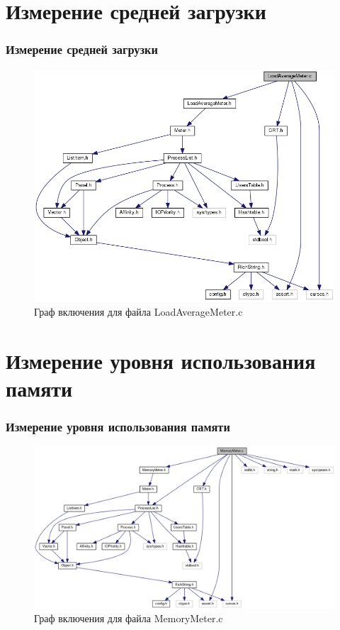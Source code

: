 \documentclass{beamer}
\begin{document}
\section{Измерение средней загрузки}

\begin{frame}
\frametitle{Измерение средней загрузки}

\begin{figure}
\includegraphics[scale=0.3]{res/load_average_meter.png}
\caption{Граф включения для файла LoadAverageMeter.c}
\end{figure}

\end{frame}
\section{Измерение уровня использования памяти}

\begin{frame}
\frametitle{Измерение уровня использования памяти}

\begin{figure}
\includegraphics[scale=0.3]{res/memory_meter.png}
\caption{Граф включения для файла MemoryMeter.c}
\end{figure}

\end{frame}
\end{document}
